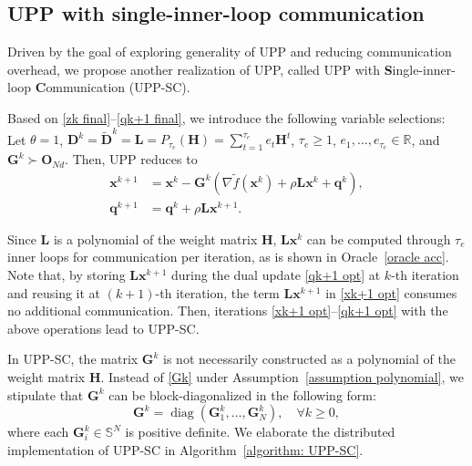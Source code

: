 \documentclass[12pt,draftcls,onecolumn]{IEEEtran}
\newcommand{\bx}{{\mathbf{x}}}
\newcommand{\bG}{{\mathbf{G}}}
\newcommand{\bH}{{\mathbf{H}}}
\begin{document}
\subsection{UPP with single-inner-loop communication} \label{subsection: UPP-SC}
Driven by the goal of exploring generality of UPP and reducing communication overhead, we propose another realization of UPP, called UPP with \textbf{S}ingle-inner-loop \textbf{C}ommunication (UPP-SC). 

Based on \eqref{zk final}--\eqref{qk+1 final}, we introduce the following variable selections: Let $\theta = 1$, $\mathbf{D}^k=\mathbf{\tilde{D}}^k = \mathbf{L}=P_{\tau_e}(\bH)=\sum_{t=1}^{\tau_e} e_t\bH^t$, $\tau_e\geq 1$, $e_1,\dots,e_{\tau_e}\in \mathbb{R}$, and $\mathbf{G}^k\succ \mathbf{O}_{Nd}$. Then, UPP reduces to
\begin{align}
	\label{xk+1 opt} \mathbf{x}^{k+1} & = \mathbf{x}^k - \mathbf{G}^k (\nabla \tilde{f}(\mathbf{x}^k) + \rho \mathbf{L} \mathbf{x}^k + \mathbf{q}^k),\\
	\label{qk+1 opt} \mathbf{q}^{k+1} &= \mathbf{q}^{k}+\rho \mathbf{L} \mathbf{x}^{k+1}.
\end{align}

Since $\mathbf{L}$ is a polynomial of the weight matrix $\mathbf{H}$, $\mathbf{L}\bx^k$ can be computed through $\tau_e$ inner loops for communication per iteration, as is shown in Oracle~\ref{oracle acc}. Note that, by storing $\mathbf{L}\mathbf{x}^{k+1}$ during the dual update \eqref{qk+1 opt} at $k$-th iteration and reusing it  at $(k+1)$-th iteration, the term $\mathbf{L} \mathbf{x}^{k+1}$ in \eqref{xk+1 opt} consumes no additional communication. Then, iterations \eqref{xk+1 opt}--\eqref{qk+1 opt} with the above operations lead to UPP-SC.

In UPP-SC, the matrix $\mathbf{G}^k$ is not necessarily constructed as a polynomial of the weight matrix $\bH$. Instead of \eqref{Gk} under Assumption~\ref{assumption polynomial}, we stipulate that $\bG^k$ can be block-diagonalized in the following form:
\begin{equation}\label{Gk block diagonalization}
    \bG^k=\operatorname{diag}(\bG_1^k,\dots,\bG_N^k), \quad \forall k\geq 0,
\end{equation}
where each $\bG_i^k\in\mathbb{S}^{N}$ is positive definite. We elaborate the distributed implementation of UPP-SC in Algorithm~\ref{algorithm: UPP-SC}.
\end{document}
